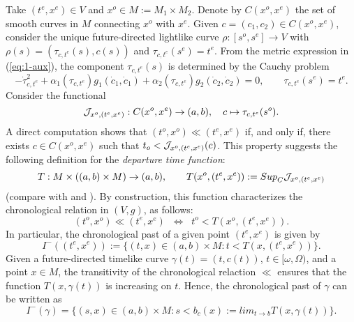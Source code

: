 Take $(t^e,x^e)\in V$ and $x^o\in M:=M_1\times M_2$. Denote by $C(x^o,x^e)$ the set of smooth curves in $M$ connecting $x^o$ with $x^e$. Given $c=(c_1,c_2)\in C(x^o,x^e)$, consider the unique future-directed lightlike curve $\rho:[s^o,s^e]\rightarrow V$ with $\rho(s)=(\tau_{c,t^e}(s),c(s))$ and $\tau_{c,t^e}(s^e)=t^e$. From the metric expression in (\ref{eq:1-aux}), the component $\tau_{c,t^e}(s)$ is determined by the Cauchy problem
\[
-\dot{\tau}_{c,t^e}^2+\alpha_1(\tau_{c,t^e})g_{1}(\dot{c}_1,\dot{c}_1)+\alpha_2(\tau_{c,t^e})g_{2}(\dot{c}_2,\dot{c}_2)=0,\qquad
    \tau_{c,t^e}(s^e)=t^e.
  \]
Consider the functional
\[{\cal J}_{x^o,(t^e,x^e)}: C(x^o,x^e) \rightarrow (a,b), \quad c \mapsto \tau_{c,t^e}(s^o).\]
A direct computation shows that $(t^o,x^o)\ll (t^e,x^e)$ if, and only if, there exists $c\in C(x^o,x^e)$ such that $t_o<{\cal J}_{x^o,(t^e,x^e)}(c)$. This property suggests the following definition for the {\em departure time function}:
\[
T:M\times \left((a,b)\times M\right)\rightarrow (a,b),\qquad T(x^{o},(t^{e},x^{e})):= {Sup}_{C}{\cal J}_{x^o,(t^e,x^e)}
\]
(compare with \cite[Section 2.9]{Perlick2004} and \cite[Section 4]{FS2}). By construction, this function characterizes the chronological relation in $(V,g)$, as follows:
\begin{equation}\label{e0}
(t^{o},x^{o}) \ll (t^{e},x^{e}) \;\; \Longleftrightarrow \;\;
t^{o}<T(x^{o},(t^{e},x^{e})).
\end{equation}
In particular, the chronological past of a given point $(t^e,x^e)$ is given by
\[
I^-\left((t^e,x^e) \right):=\{(t,x)\in (a,b)\times M: t<T(x,(t^e,x^e)) \}.
  \]
Given a future-directed timelike curve $\gamma(t)=(t,c(t))$, $t\in [\omega,\Omega)$, and a point $x\in M$, the transitivity of the chronological relaction $\ll$ ensures that the function $T(x,\gamma(t))$ is increasing on $t$. Hence, the chronological past of $\gamma$ can be written as
  \[
I^-(\gamma)=\{(s,x)\in (a,b)\times M: s<b_c(x):=lim_{t\rightarrow b}T(x,\gamma(t))\}.
    \]

